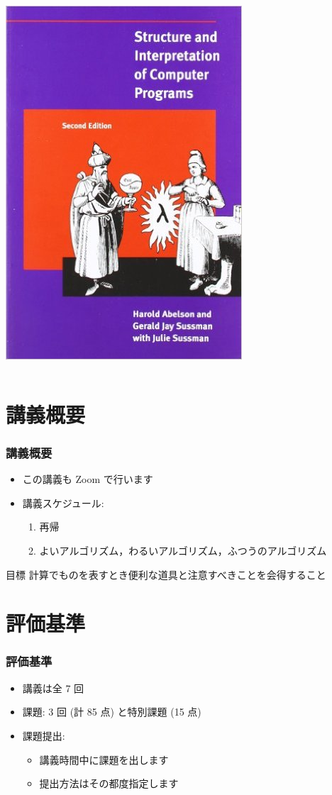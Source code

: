 \begin{frame}[shrink]
\begin{columns}[c]
\begin{column}{0.45\textwidth}
\includegraphics[scale=.25]{./Figure/SICP.jpg}
    \end{column}
  \end{columns}
\end{frame}
%
%
\section{講義概要}
\begin{frame}
\frametitle{講義概要}
  \begin{itemize}
\item この講義も Zoom で行います
\item 講義スケジュール:
    \begin{enumerate}
\item 再帰
\item よいアルゴリズム，わるいアルゴリズム，ふつうのアルゴリズム
    \end{enumerate}
  \end{itemize}
  \begin{block}{目標}
計算でものを表すとき便利な道具と注意すべきことを会得すること
  \end{block}
\end{frame}
%
%
\section{評価基準}
\begin{frame}
\frametitle{評価基準}
  \begin{itemize}
\item 講義は全 7 回
\item 課題: 3 回 (計 85 点) と特別課題 (15 点)
\item 課題提出: 
    \begin{itemize}
\item 講義時間中に課題を出します
\item 提出方法はその都度指定します
    \end{itemize}
  \end{itemize}
\end{frame}
